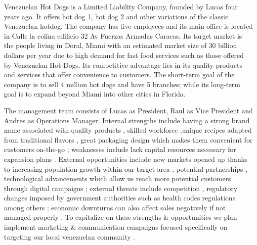  

Venezuelan Hot Dogs is a Limited Liability Company, founded by Lucas four years ago. It offers hot dog 1, hot dog 2 and other variations of the classic Venezuelan hotdog. The company has five employees and its main office is located in Calle la colina edificio 32 Av Fuerzas Armadas Caracas. Its target market is the people living in Doral, Miami with an estimated market size of 30 billion dollars per year due to high demand for fast food services such as those offered by Venezuelan Hot Dogs. Its competitive advantage lies in its quality products and services that offer convenience to customers. The short-term goal of the company is to sell 4 million hot dogs and have 5 branches; while its long-term goal is to expand beyond Miami into other cities in Florida. 

The management team consists of Lucas as President, Raul as Vice President and Andres as Operations Manager. Internal strengths include having a strong brand name associated with quality products , skilled workforce ,unique recipes adapted from traditional flavors , great packaging design which makes them convenient for customers on-the-go ; weaknesses include lack capital resources necessary for expansion plans . External opportunities include new markets opened up thanks to increasing population growth within our target area , potential partnerships , technological advancements which allow us reach more potential customers through digital campaigns ; external threats include competition , regulatory changes imposed by government authorities such as health codes regulations among others ; economic downturns can also affect sales negatively if not managed properly . To capitalize on these strengths & opportunities we plan implement marketing & communication campaigns focused specifically on targeting our local venezuelan community .